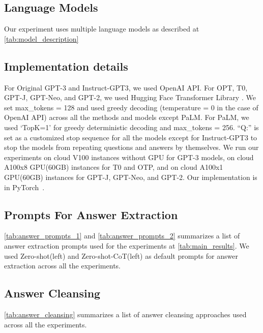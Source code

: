 \documentclass{article}
\newcommand{\ours}{Zero-shot-CoT\xspace}
\newcommand{\theirsz}{Zero-shot\xspace}
\begin{document}
\subsection{Language Models}
\label{appx:model_description}

Our experiment uses multiple language models as described at \autoref{tab:model_description}




\subsection{Implementation details}
For Original GPT-3 and Instruct-GPT3, we used OpenAI API. 
For OPT, T0, GPT-J, GPT-Neo, and GPT-2, we used Hugging Face Transformer Library \citep{huggingface}.
We set max\_tokens = 128 and used greedy decoding (temperature = 0 in the case of OpenAI API) across all the methods and models except PaLM.
For PaLM, we used `TopK=1' for greedy deterministic decoding and max\_tokens = 256.
``Q:'' is set as a customized stop sequence for all the models except for Instruct-GPT3 to stop the models from repeating questions and answers by themselves.
We run our experiments on cloud V100 instances without GPU for GPT-3 models, on cloud A100x8 GPU(60GB) instances for T0 and OTP, and on cloud A100x1 GPU(60GB) instances for GPT-J, GPT-Neo, and GPT-2. Our implementation is in PyTorch~\citep{paszke2019pytorch}.

\subsection{Prompts For Answer Extraction}
\label{appx:answer_prompts}

\autoref{tab:answer_prompts_1} and \autoref{tab:answer_prompts_2} summarizes a list of answer extraction prompts used for the experiments at \autoref{tab:main_results}. 
We used \theirsz (left) and \ours (left) as default prompts for answer extraction across all the experiments.



\subsection{Answer Cleansing}
\label{appx:answer_cleansing}

\autoref{tab:answer_cleansing} summarizes a list of answer cleansing approaches used across all the experiments.
\end{document}
